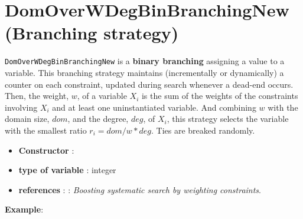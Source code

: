\section{DomOverWDegBinBranchingNew (Branching strategy)}\label{domoverwdegbin:domoverwdegbinbranchstrat}\hypertarget{domoverwdegbin:domoverwdegbinbranchstrat}{}
\begin{notedef}
  \texttt{DomOverWDegBinBranchingNew} is a \textbf{binary branching} assigning a value to a variable. This branching strategy maintains (incrementally or dynamically) a counter on each constraint, updated during search whenever a dead-end occurs. Then, the weight, $w$, of a variable $X_i$ is the sum of the weights of the constraints involving $X_i$ and at least one uninstantiated variable. And combining $w$ with the domain size, $dom$, and the degree, $deg$, of $X_i$, this strategy selects the variable with the smallest ratio $r_i=dom/w*deg$. Ties are breaked randomly.
\end{notedef}

\begin{itemize}
	\item \textbf{Constructor} :
	\item \textbf{type of variable} : integer
	\item \textbf{references} : \cite{Boussemart04}: \emph{Boosting systematic search by weighting constraints}.
\end{itemize}

\textbf{Example}:
%

